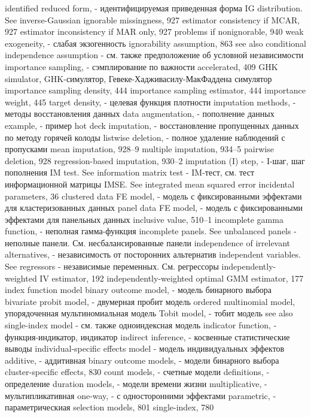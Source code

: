 identified reduced form, - идентифицируемая приведенная форма
IG distribution. See inverse-Gaussian ignorable missingness, 927
estimator consistency if MCAR, 927 estimator inconsistency if MAR only, 927 problems if nonignorable, 940
weak exogeneity, - слабая экзогенность
ignorability assumption, 863
see also conditional independence assumption - см. также предположение об условной независимости
importance sampling, - сэмплирование по важности 
accelerated, 409
GHK simulator, GHK-симулятор, Гевеке-Хадживасилу-МакФаддена симулятор
importance sampling density, 444 
importance sampling estimator, 444 
importance weight, 445
target density, - целевая функция плотности 
imputation methods, - методы восстановления данных
data augmentation, - пополнение данных 
example, - пример
hot deck imputation, - восстановление пропущенных данных по методу горячей колоды
listwise deletion, - полное удаление наблюдений с пропусками
mean imputation, 928–9
multiple imputation, 934–5 pairwise deletion, 928 regression-based imputation, 930–2
imputation (I) step, - I-шаг, шаг пополнения
IM test. See information matrix test - IM-тест, см. тест информационной матрицы
IMSE. See integrated mean squared error incidental parameters, 36
clustered data FE model, - модель с фиксированными эффектами для кластеризованных данных
panel data FE model, - модель с фиксированными эффектами для панельных данных 
inclusive value, 510–1
incomplete gamma function, - неполная гамма-функция
incomplete panels. See unbalanced panels  - неполные панели. См. несбалансированные панели
independence of irrelevant alternatives, - независимость от посторонних альтернатив 
independent variables. See regressors - независимые переменных. См. регрессоры
independently-weighted IV estimator, 192 independently-weighted optimal GMM estimator, 177 index function model
binary outcome model, - модель бинарного выбора 
bivariate probit model, - двумерная пробит модель  
ordered multinomial model, упорядоченная мультиномиальная модель 
Tobit model, - тобит модель
see also single-index model - см. также одноиндексная модель
indicator function, - функция-индикатор, индикатор
indirect inference, - косвенные статистические выводы
individual-specific effects model - модель индивидуальных эффектов
additive, - аддитивная
binary outcome models, - модели бинарного выбора 
cluster-specific effects, 830 
count models, - счетные модели 
definitions, - определение
duration models, - модели времени жизни
multiplicative, - мультипликативная
one-way, - с односторонними эффектами
parametric, - параметрическиая
selection models, 801 
single-index, 780
